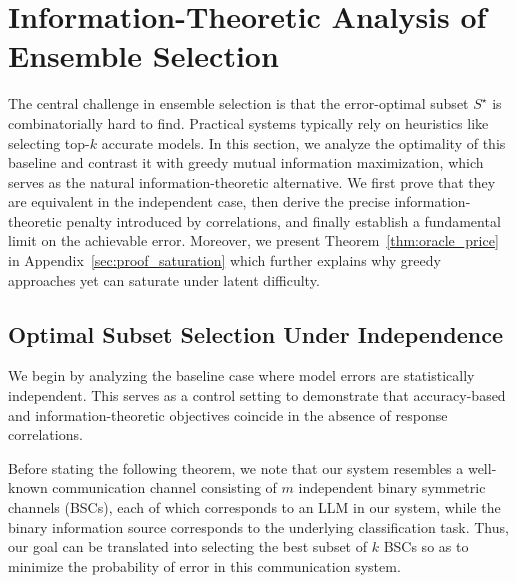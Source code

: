 \documentclass{article}
\theoremstyle{plain}
\theoremstyle{definition}
\theoremstyle{remark}
\begin{document}
\section{Information-Theoretic Analysis of Ensemble Selection}
\label{sec:theory}

The central challenge in ensemble selection is that the error-optimal subset $S^\star$ is combinatorially hard to find. Practical systems typically rely on heuristics like selecting top-$k$ accurate models. In this section, we analyze the optimality of this baseline and contrast it with greedy mutual information maximization, which serves as the natural information-theoretic alternative. We first prove that they are equivalent in the independent case, then derive the precise information-theoretic penalty introduced by correlations, and finally establish a fundamental limit on the achievable error. Moreover, we present Theorem~\ref{thm:oracle_price} in Appendix~\ref{sec:proof_saturation} which further explains why greedy approaches yet can saturate under latent difficulty.

\subsection{Optimal Subset Selection  Under Independence}
\label{subsec:alignment}

We begin by analyzing the baseline case where model errors are statistically independent. This serves as a control setting to demonstrate that accuracy-based and information-theoretic objectives coincide in the absence of response correlations. 

Before stating the following theorem, we note that our system resembles a well-known communication channel consisting of $m$ independent binary symmetric channels (BSCs), each of which corresponds to an LLM in our system, while the binary information source corresponds to the underlying classification task. Thus, our goal can be translated into selecting the best subset of $k$ BSCs so as to minimize the probability of error in this communication system.
\end{document}
